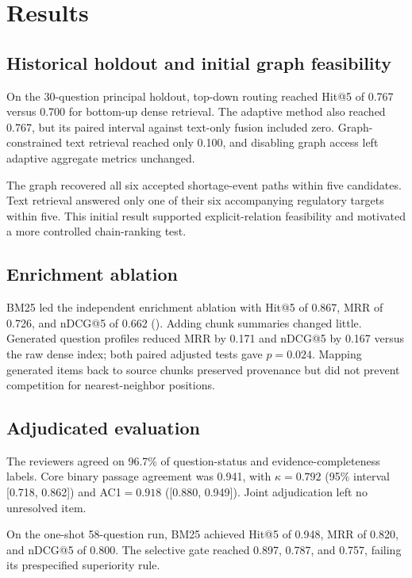 \section{Results}
\label{sec:results}

\subsection{Historical holdout and initial graph feasibility}

On the 30-question principal holdout, top-down routing reached Hit@5 of 0.767 versus 0.700 for bottom-up dense retrieval. The adaptive method also reached 0.767, but its paired interval against text-only fusion included zero. Graph-constrained text retrieval reached only 0.100, and disabling graph access left adaptive aggregate metrics unchanged.

The graph recovered all six accepted shortage-event paths within five candidates. Text retrieval answered only one of their six accompanying regulatory targets within five. This initial result supported explicit-relation feasibility and motivated a more controlled chain-ranking test.

\subsection{Enrichment ablation}

BM25 led the independent enrichment ablation with Hit@5 of 0.867, MRR of 0.726, and nDCG@5 of 0.662 (). Adding chunk summaries changed little. Generated question profiles reduced MRR by 0.171 and nDCG@5 by 0.167 versus the raw dense index; both paired adjusted tests gave $p=0.024$. Mapping generated items back to source chunks preserved provenance but did not prevent competition for nearest-neighbor positions.

\subsection{Adjudicated evaluation}

The reviewers agreed on 96.7\% of question-status and evidence-completeness labels. Core binary passage agreement was 0.941, with $\kappa=0.792$ (95\% interval [0.718, 0.862]) and AC1$=0.918$ ([0.880, 0.949]). Joint adjudication left no unresolved item.

On the one-shot 58-question run, BM25 achieved Hit@5 of 0.948, MRR of 0.820, and nDCG@5 of 0.800. The selective gate reached 0.897, 0.787, and 0.757, failing its prespecified superiority rule.

